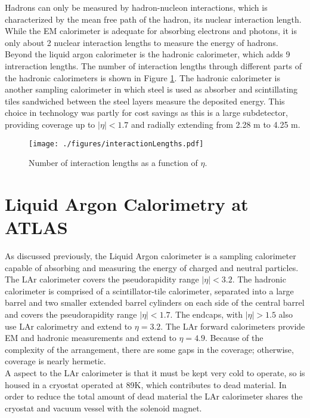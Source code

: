 Hadrons can only be measured by hadron-nucleon interactions, which is characterized by the mean free path of the hadron, its nuclear interaction length.  While the EM calorimeter is adequate for absorbing electrons and photons, it is only about 2 nuclear interaction lengths to measure the energy of hadrons.  Beyond the liquid argon calorimeter is the hadronic calorimeter, which adds 9 intreraction lengths.  The number of interaction lengths through different parts of the hadronic calorimeters is shown in Figure \ref{fig:interactionLengths}.  The hadronic calorimeter is another sampling calorimeter in which steel is used as absorber and scintillating tiles sandwiched between the steel layers measure the deposited energy.  This choice in technology was partly for cost savings as this is a large subdetector, providing coverage up to $|\eta|<1.7$ and radially extending from 2.28 m to 4.25 m.  \\

\begin{figure}[h!]
  \centering
	\texttt{[image: ./figures/interactionLengths.pdf]}
\caption{\label{fig:interactionLengths}{ Number of interaction lengths as a function of $\eta$. }} %
\end{figure}

\section{Liquid Argon Calorimetry at ATLAS}

As discussed previously, the Liquid Argon calorimeter is a sampling calorimeter capable of absorbing and measuring the energy of charged and neutral particles.  The LAr calorimeter covers the pseudorapidity range $|\eta| < 3.2$.  The hadronic calorimeter is comprised of a scintillator-tile calorimeter, separated into a large barrel and two smaller extended barrel cylinders on each side of the central barrel and covers the pseudorapidity range $|\eta| < 1.7$.  The endcaps, with $|\eta| > 1.5$ also use LAr calorimetry and extend to $\eta = 3.2$.  The LAr forward calorimeters provide EM and hadronic measurements and extend to $\eta = 4.9$.  Because of the complexity of the arrangement, there are some gaps in the coverage; otherwise, coverage is nearly hermetic.  \\

A aspect to the LAr calorimeter is that it must be kept very cold to operate, so is housed in a cryostat operated at 89K, which contributes to dead material.  In order to reduce the total amount of dead material the LAr calorimeter shares the cryostat and vacuum vessel with the solenoid magnet.  \\

